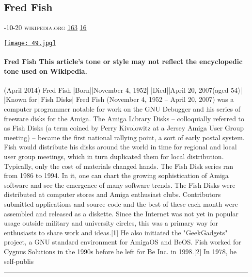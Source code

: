 \documentclass[10pt,a4paper]{article}
\begin{document}
\begin{multicols}{2}
\begin{minipage}{\linewidth}
\subsection{Fred Fish}
\textsc{\footnotesize
{\scriptsize\faCalendar}-10-20 
{\scriptsize\faGlobe}\space 
wikipedia.org 
{\scriptsize\faThumbsOUp}\space 
\href{http://news.ycombinator.com/item?id=37148062\&utm\_term=comment}{163} 
{\scriptsize\faComments}\space 
\href{http://news.ycombinator.com/item?id=37148062\&utm\_term=comment}{16} 
}
\par\medskip\noindent
\href{https://en.wikipedia.org/wiki/Fred\_Fish?utm\_source=hackernewsletter\&utm\_medium=email\&utm\_term=learn}{
    \texttt{[image: 49.jpg]}
}
\end{minipage}
\paragraph{}
\textbf{Fred Fish
This article's tone or style may not reflect the encyclopedic tone used on Wikipedia.}
\paragraph{}
 (April 2014)
Fred Fish
|Born||November 4, 1952|
|Died||April 20, 2007(aged 54)|
|Known for||Fish Disks|
Fred Fish (November 4, 1952 – April 20, 2007) was a computer programmer notable for work on the GNU Debugger and his series of freeware disks for the Amiga.
The Amiga Library Disks – colloquially referred to as Fish Disks (a term coined by Perry Kivolowitz at a Jersey Amiga User Group meeting) – became the first national rallying point, a sort of early postal system. Fish would distribute his disks around the world in time for regional and local user group meetings, which in turn duplicated them for local distribution. Typically, only the cost of materials changed hands. The Fish Disk series ran from 1986 to 1994. In it, one can chart the growing sophistication of Amiga software and see the emergence of many software trends.
The Fish Disks were distributed at computer stores and Amiga enthusiast clubs. Contributors submitted applications and source code and the best of these each month were assembled and released as a diskette. Since the Internet was not yet in popular usage outside military and university circles, this was a primary way for enthusiasts to share work and ideas.[1] He also initiated the "GeekGadgets" project, a GNU standard environment for AmigaOS and BeOS.
Fish worked for Cygnus Solutions in the 1990s before he left for Be Inc. in 1998.[2]
In 1978, he self-publis
\par\noindent\textcolor{red}{\rule{\linewidth}{0.2mm}}
\vfill
\null
\noindent\begin{minipage}{\linewidth}

\end{minipage}
\end{multicols}
\end{document}
